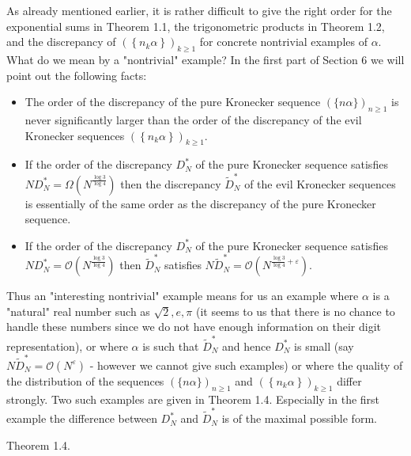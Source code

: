 \documentclass[10pt]{article}
\newcommand{\1}{\mathbf{1}}
\begin{document}
As already mentioned earlier, it is rather difficult to give the right order for the exponential sums in Theorem 1.1, the trigonometric products in Theorem 1.2, and the discrepancy of $\left(\left\{n_{k} \alpha\right\}\right)_{k \geqslant 1}$ for concrete nontrivial examples of $\alpha$. What do we mean by a "nontrivial" example? In the first part of Section 6 we will point out the following facts:

\begin{itemize}
  \item[-] The order of the discrepancy of the pure Kronecker sequence $(\{n \alpha\})_{n \geqslant 1}$ is never significantly larger than the order of the discrepancy of the evil Kronecker sequences $\left(\left\{n_{k} \alpha\right\}\right)_{k \geqslant 1}$.
\end{itemize}

\begin{itemize}
  \item[-] If the order of the discrepancy $D_{N}^{*}$ of the pure Kronecker sequence satisfies $N D_{N}^{*}=\Omega\left(N^{\frac{\log 3}{\log 4}}\right)$ then the discrepancy $\widetilde{D}_{N}^{*}$ of the evil Kronecker sequences is essentially of the same order as the discrepancy of the pure Kronecker sequence.
  \item[-] If the order of the discrepancy $D_{N}^{*}$ of the pure Kronecker sequence satisfies $N D_{N}^{*}=\mathcal{O}\left(N^{\frac{\log 3}{\log 4}}\right)$ then $\widetilde{D}_{N}^{*}$ satisfies $N \widetilde{D}_{N}^{*}=\mathcal{O}\left(N^{\frac{\log 3}{\log 4}+\varepsilon}\right)$.
\end{itemize}

Thus an "interesting nontrivial" example means for us an example where $\alpha$ is a "natural" real number such as $\sqrt{2}, e, \pi$ (it seems to us that there is no chance to handle these numbers since we do not have enough information on their digit representation), or where $\alpha$ is such that $\widetilde{D}_{N}^{*}$ and hence $D_{N}^{*}$ is small (say $N \widetilde{D}_{N}^{*}=\mathcal{O}\left(N^{\varepsilon}\right)$ - however we cannot give such examples) or where the quality of the distribution of the sequences $(\{n \alpha\})_{n \geqslant 1}$ and $\left(\left\{n_{k} \alpha\right\}\right)_{k \geqslant 1}$ differ strongly. Two such examples are given in Theorem 1.4. Especially in the first example the difference between $D_{N}^{*}$ and $\widetilde{D}_{N}^{*}$ is of the maximal possible form.

Theorem 1.4.
\end{document}
